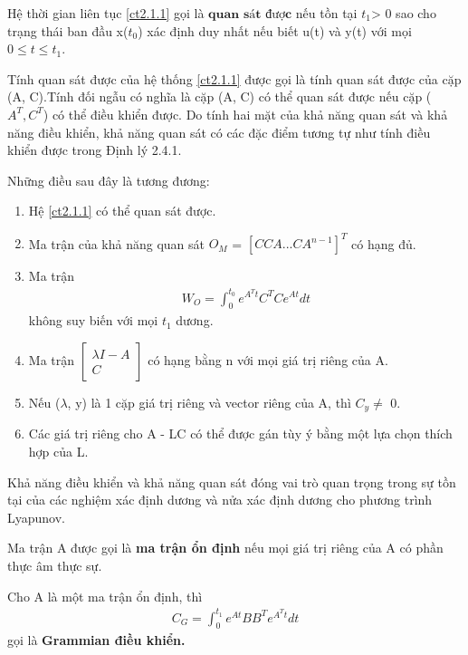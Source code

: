 \newpage
\begin{definition}
Hệ thời gian liên tục \eqref{ct2.1.1} gọi là $\textbf{quan sát được}$ nếu tồn tại $t_1$> 0 sao cho trạng thái ban đầu x($t_0$) xác định duy nhất nếu biết u(t) và y(t) với mọi $0 \leq t \leq  t_1 $. 
\end{definition}
Tính quan sát được của hệ thống \eqref{ct2.1.1} được gọi là tính quan sát được của cặp (A, C).Tính đối ngẫu có nghĩa là cặp (A, C) có thể quan sát được nếu cặp ($A^{T}, C^{T}$) có thể điều khiển được. Do tính hai mặt của khả năng quan sát và khả năng điều khiển, khả năng quan sát có các đặc điểm tương tự như tính điều khiển được trong Định lý 2.4.1.
\begin{theorem}
Những điều sau đây là tương đương:
\renewcommand{\theenumiii}{\roman{enumii}}
\begin{enumerate}
    \item Hệ \eqref{ct2.1.1} có thể quan sát được.
    \item Ma trận của khả năng quan sát $O_M$ = $[C CA ... CA^{n-1} ]^{T}$ có hạng đủ.
    \item Ma trận
    \begin{align*}
        W_O = \int_{0}^{t_0}e^{A^{T}t}C^{T}Ce^{At}dt
    \end{align*}
không suy biến với mọi $t_1$ dương.
    \item Ma trận 
    \begin{math}
        \begin{bmatrix}
    \lambda I -A \\
    C
    \end{bmatrix}
    \end{math}
có hạng bằng n với mọi giá trị riêng của A.
    \item Nếu ($\lambda$, y) là 1 cặp giá trị riêng và vector riêng của A, thì $C_y \neq$ 0.
    \item Các giá trị riêng cho A - LC có thể được gán tùy ý bằng một lựa chọn thích hợp của L.
\end{enumerate}
\end{theorem}
Khả năng điều khiển và khả năng quan sát đóng vai trò quan trọng trong sự tồn tại của các nghiệm xác định dương và nửa xác định dương cho phương trình Lyapunov.
\begin{definition}
Ma trận A được gọi là \textbf{ma trận ổn định} nếu mọi giá trị riêng của A có phần thực âm thực sự.
\end{definition}
\begin{definition}
Cho A là một ma trận ổn định, thì 
\begin{align}
    C_G = \int_{0}^{t_1}e^{At}BB^{T}e^{A^{T}t}dt
\end{align}
gọi là \textbf{Grammian điều khiển.}
\end{definition}
